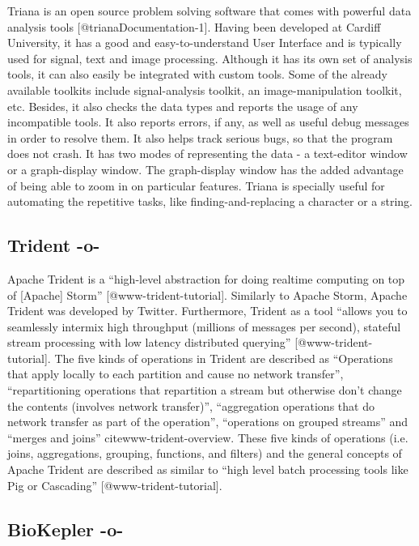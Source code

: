 Triana is an open source problem solving software that comes with
powerful data analysis tools [@trianaDocumentation-1].  Having
been developed at Cardiff University, it has a good and
easy-to-understand User Interface and is typically used for signal,
text and image processing.  Although it has its own set of analysis
tools, it can also easily be integrated with custom tools.  Some of
the already available toolkits include signal-analysis toolkit, an
image-manipulation toolkit, etc.  Besides, it also checks the data
types and reports the usage of any incompatible tools.  It also
reports errors, if any, as well as useful debug messages in order to
resolve them.  It also helps track serious bugs, so that the program
does not crash.  It has two modes of representing the data - a
text-editor window or a graph-display window.  The graph-display
window has the added advantage of being able to zoom in on particular
features.  Triana is specially useful for automating the repetitive
tasks, like finding-and-replacing a character or a string.
   
\subsection{Trident -o-}

Apache Trident is a ``high-level abstraction for doing realtime
computing on top of [Apache]
Storm'' [@www-trident-tutorial]. Similarly to Apache Storm, Apache
Trident was developed by Twitter.  Furthermore, Trident as a tool
``allows you to seamlessly intermix high throughput (millions of
messages per second), stateful stream processing with low latency
distributed querying'' [@www-trident-tutorial].  The five kinds of
operations in Trident are described as ``Operations that apply locally
to each partition and cause no network transfer'', ``repartitioning
operations that repartition a stream but otherwise don't change the
contents (involves network transfer)'', ``aggregation operations that
do network transfer as part of the operation'', ``operations on
grouped streams'' and ``merges and joins'' cite{www-trident-overview}.
These five kinds of operations (i.e. joins, aggregations, grouping,
functions, and filters) and the general concepts of Apache Trident are
described as similar to ``high level batch processing tools like Pig
or Cascading'' [@www-trident-tutorial].



\subsection{BioKepler -o-}
    
